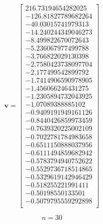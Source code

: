 \documentclass[11pt]{article}
\begin{document}
\begin{multicols}{3}
$$
 \textbf{v} =
 \begin{bmatrix}
216.73194654282025 \\
-126.81827789682264 \\
-40.03015741979313 \\
-14.240244349046273 \\
-8.499822670072643 \\
-5.236067977499788 \\
-3.766822029130398 \\
-2.7580423738097704 \\
-2.177499542899792 \\
-1.7414906590978905 \\
-1.456066246431275 \\
-1.2305894732043925 \\
-1.07089388885102 \\
-0.9409191949161126 \\
-0.8440426859973459 \\
-0.7639320225002109 \\
-0.7022781784983658 \\
-0.6511150888037956 \\
-0.6111494859682942 \\
-0.5783794940752622 \\
-0.5529736718514865 \\
-0.5329619142946429 \\
-0.518255221991411 \\
-0.50198550133501 \\
-0.5079795559292898 \\
\end{bmatrix}
$$

 $$n = 30$$


\end{multicols}
\end{document}
